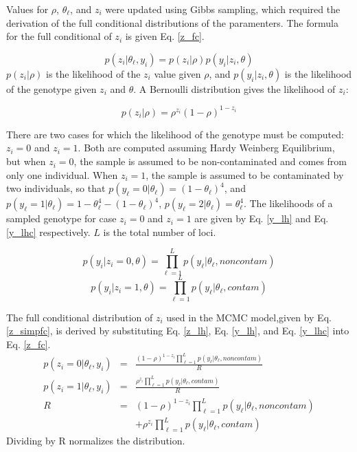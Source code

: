Values for $\rho$, $\theta_{\ell}$, and $z_i$ were updated using Gibbs sampling, which required the derivation of the full conditional distributions of the paramenters. The formula for the full conditional of $z_i$ is given Eq. \ref{z_fc}.

\begin{equation} \label{z_fc}
p(z_i|\theta_{\ell},y_i) = p(z_i|\rho)p(y_i|z_i,\theta)
\end{equation}
$p(z_i|\rho)$ is the likelihood of the $z_i$ value given $\rho$, and $p(y_i|z_i,\theta)$ is the likelihood of the genotype given $z_i$ and $\theta$.  A Bernoulli distribution gives the likelihood of $z_i$:

\begin{equation} \label{z_lh}
p(z_i|\rho) = \rho^{z_i}(1-\rho)^{1-z_i} 
\end{equation}

There are two cases for which the likelihood of the genotype must be computed: $z_i = 0$ and $z_i = 1$.  Both are computed assuming Hardy Weinberg Equilibrium, but when $z_i = 0$, the sample is assumed to be non-contaminated and comes from only one individual.  When $z_i = 1$, the sample is assumed to be contaminated by two individuals, so that $p(y_{\ell} = 0|\theta_{\ell}) = (1-\theta_{\ell})^4$, and $p(y_{\ell} = 1|\theta_{\ell}) = 1 -\theta_{\ell}^4 - (1-\theta_{\ell})^4$, $p(y_{\ell} = 2|\theta_{\ell}) = \theta_{\ell}^4$.  The likelihoods of a sampled genotype for case $z_i = 0$ and $z_i = 1$ are given by Eq. \ref{y_lh} and Eq. \ref{y_lhc} respectively.  $L$ is the total number of loci.

\begin{equation} \label{y_lh}
p(y_i|z_i=0,\theta) = \prod_{\ell=1}^{L} p(y_{\ell}|\theta_{\ell},noncontam)
\end{equation}
\begin{equation} \label{y_lhc}
p(y_i|z_i=1,\theta) = \prod_{\ell=1}^{L} p(y_{\ell}|\theta_{\ell},contam)
\end{equation}

The full conditional distribution of $z_i$ used in the MCMC model,given by Eq. \ref{z_simpfc}, is derived by substituting Eq. \ref{z_lh}, Eq. \ref{y_lh}, and Eq. \ref{y_lhc} into Eq. \ref{z_fc}.
\begin{eqnarray} \label{z_simpfc}
p(z_i=0|\theta_{\ell},y_i) &=& \frac{(1-\rho)^{1-z_i}\prod_{\ell=1}^{L} p(y_{\ell}|\theta_{\ell},noncontam)}{R} \nonumber \\
p(z_i=1|\theta_{\ell},y_i) &=& \frac{\rho^{z_i}\prod_{\ell=1}^{L} p(y_{\ell}|\theta_{\ell},contam)}{R} \nonumber \\
R &=& (1-\rho)^{1-z_i}\prod_{\ell=1}^{L} p(y_{\ell}|\theta_{\ell},noncontam) \nonumber \\
& & +\rho^{z_i}\prod_{\ell=1}^{L} p(y_{\ell}|\theta_{\ell},contam) 
\end{eqnarray}
Dividing by R normalizes the distribution. \\


